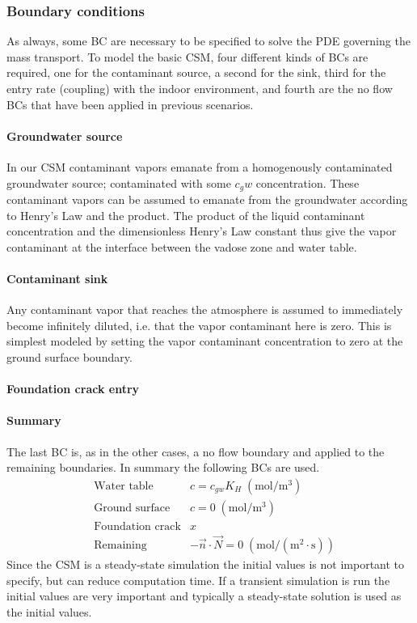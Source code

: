 \subsubsection{Boundary conditions}

As always, some BC are necessary to be specified to solve the PDE governing the mass transport.
To model the basic CSM, four different kinds of BCs are required, one for the contaminant source, a second for the sink, third for the entry rate (coupling) with the indoor environment, and fourth are the no flow BCs that have been applied in previous scenarios.

\paragraph{Groundwater source}

In our CSM contaminant vapors emanate from a homogenously contaminated groundwater source; contaminated with some $c_gw$ concentration.
These contaminant vapors can be assumed to emanate from the groundwater according to Henry's Law and the product.
The product of the liquid contaminant concentration and the dimensionless Henry's Law constant thus give the vapor contaminant at the interface between the vadose zone and water table.

\paragraph{Contaminant sink}

Any contaminant vapor that reaches the atmosphere is assumed to immediately become infinitely diluted, i.e. that the vapor contaminant here is zero.
This is simplest modeled by setting the vapor contaminant concentration to zero at the ground surface boundary.

\paragraph{Foundation crack entry}


\paragraph{Summary}

The last BC is, as in the other cases, a no flow boundary and applied to the remaining boundaries.
In summary the following BCs are used.
\begin{align}\label{eq:mass_transport_bc}
  &\text{Water table} &c = c_{gw} K_H \; \mathrm{(mol/m^3)} \\
  &\text{Ground surface} &c = 0 \; \mathrm{(mol/m^3)} \\
  &\text{Foundation crack} &x \\
  &\text{Remaining} &-\vec{n}\cdot\vec{N} = 0 \; \mathrm{(mol/(m^2\cdot s))}
\end{align}
Since the CSM is a steady-state simulation the initial values is not important to specify, but can reduce computation time.
If a transient simulation is run the initial values are very important and typically a steady-state solution is used as the initial values.\par
